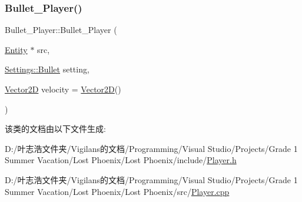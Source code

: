 \subsubsection{\texorpdfstring{Bullet\+\_\+\+Player()}{Bullet\_Player()}}
{\footnotesize\ttfamily Bullet\+\_\+\+Player\+::\+Bullet\+\_\+\+Player (\begin{DoxyParamCaption}\item[{\hyperlink{class_entity}{Entity} $\ast$}]{src,  }\item[{\hyperlink{struct_settings_1_1_bullet}{Settings\+::\+Bullet}}]{setting,  }\item[{\hyperlink{_vector2_d_8hpp_aa1f1145650f1dd9bddf7335ec6434d7c}{Vector2D}}]{velocity = {\ttfamily \hyperlink{_vector2_d_8hpp_aa1f1145650f1dd9bddf7335ec6434d7c}{Vector2D}()} }\end{DoxyParamCaption})}



该类的文档由以下文件生成\+:\begin{DoxyCompactItemize}
\item 
D\+:/叶志浩文件夹/\+Vigilans的文档/\+Programming/\+Visual Studio/\+Projects/\+Grade 1 Summer Vacation/\+Lost Phoenix/\+Lost Phoenix/include/\hyperlink{_player_8h}{Player.\+h}\item 
D\+:/叶志浩文件夹/\+Vigilans的文档/\+Programming/\+Visual Studio/\+Projects/\+Grade 1 Summer Vacation/\+Lost Phoenix/\+Lost Phoenix/src/\hyperlink{_player_8cpp}{Player.\+cpp}\end{DoxyCompactItemize}
